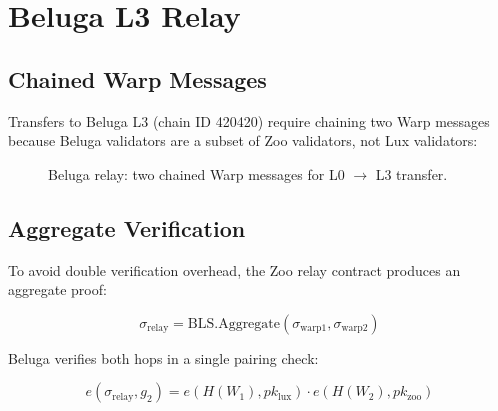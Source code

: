 \section{Beluga L3 Relay}

\label{sec:beluga}

\subsection{Chained Warp Messages}

Transfers to Beluga L3 (chain ID 420420) require chaining two Warp messages because Beluga validators are a subset of Zoo validators, not Lux validators:

\begin{figure}[t]
\centering
{}
\caption{Beluga relay: two chained Warp messages for L0 $\to$ L3 transfer.}
\label{fig:relay}
\end{figure}

\subsection{Aggregate Verification}

To avoid double verification overhead, the Zoo relay contract produces an aggregate proof:

\begin{equation}
\sigma_{\text{relay}} = \text{BLS.Aggregate}(\sigma_{\text{warp1}}, \sigma_{\text{warp2}})
\end{equation}

Beluga verifies both hops in a single pairing check:

\begin{equation}
e(\sigma_{\text{relay}}, g_2) = e(H(W_1), pk_{\text{lux}}) \cdot e(H(W_2), pk_{\text{zoo}})
\end{equation}

